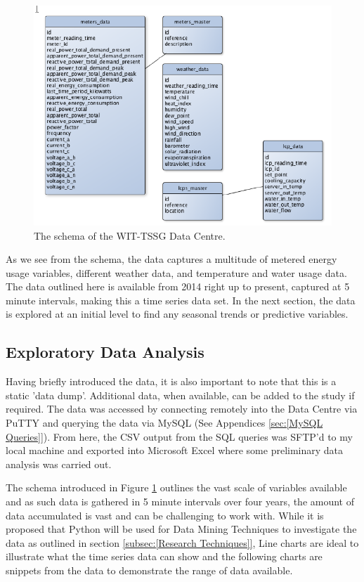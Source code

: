 \documentclass[12pt]{scrartcl}
\begin{document}
\begin{figure}[h]
  \caption{The schema of the WIT-TSSG Data Centre.}
  \label{fig:TSSGdataschema}
  \centering
    \includegraphics[scale=0.45]{TSSG_Data_Schema.png}
\end{figure}

As we see from the schema, the data captures a multitude of metered energy usage variables, different weather data, and temperature and water usage data. The data outlined here is available from 2014 right up to present, captured at 5 minute intervals, making this a time series data set. In the next section, the data is explored at an initial level to find any seasonal trends or predictive variables. 
 
\subsection{Exploratory Data Analysis}
\label{subsec:[Exploratory Data Analysis]}
Having briefly introduced the data, it is also important to note that this is a static 'data dump'. Additional data, when available, can be added to the study if required. The data was accessed by connecting remotely into the Data Centre via PuTTY and querying the data via MySQL (See Appendices \ref{sec:[MySQL Queries]}). From here, the CSV output from the SQL queries was SFTP'd to my local machine and exported into Microsoft Excel where some preliminary data analysis was carried out. 

The schema introduced in Figure \ref{fig:TSSGdataschema} outlines the vast scale of variables available and as such data is gathered in 5 minute intervals over four years, the amount of data accumulated is vast and can be challenging to work with. While it is proposed that Python will be used for Data Mining Techniques to investigate the data as outlined in section \ref{subsec:[Research Techniques]}, Line charts are ideal to illustrate what the time series data can show and the following charts are snippets from the data to demonstrate the range of data available.
\end{document}
